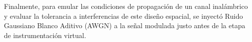 \begin{table}[h]
    \centering
    \caption{Parámetros de mapeo vectorial para el transmisor Q-PSK}
    \label{tab:diseno_qpsk}
\end{table}
Finalmente, para emular las condiciones de propagación de un canal inalámbrico y evaluar la tolerancia a interferencias de este diseño espacial, se inyectó Ruido Gaussiano Blanco Aditivo (AWGN) a la señal modulada justo antes de la etapa de instrumentación virtual.